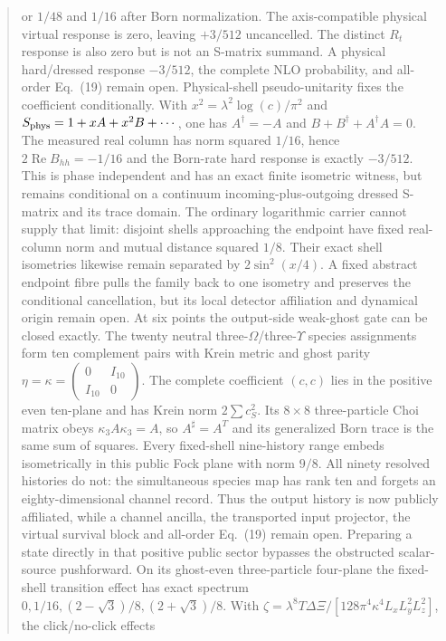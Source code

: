\documentclass[11pt]{article}
\theoremstyle{definition}
\theoremstyle{remark}
\begin{document}
\begin{abstract}
or $1/48$ and $1/16$ after Born normalization.  The axis-compatible physical
virtual response is zero, leaving $+3/512$ uncancelled.  The distinct $R_t$
response is also zero but is not an S-matrix summand.  A physical hard/dressed
response $-3/512$, the complete NLO probability, and all-order Eq.~(19) remain
open.
Physical-shell pseudo-unitarity fixes the coefficient conditionally.  With
$x^2=\lambda^2\log(c)/\pi^2$ and
$S_{\rm phys}=1+xA+x^2B+\cdots$, one has
$A^\dagger=-A$ and $B+B^\dagger+A^\dagger A=0$.  The measured real column has
norm squared $1/16$, hence $2\operatorname{Re}B_{hh}=-1/16$ and the Born-rate
hard response is exactly $-3/512$.  This is phase independent and has an exact
finite isometric witness, but remains conditional on a continuum
incoming-plus-outgoing dressed S-matrix and its trace domain.
The ordinary logarithmic carrier cannot supply that limit: disjoint shells
approaching the endpoint have fixed real-column norm and mutual distance
squared $1/8$.  Their exact shell isometries likewise remain separated by
$2\sin^2(x/4)$.  A fixed abstract endpoint fibre pulls the family back to one
isometry and preserves the conditional cancellation, but its local detector
affiliation and dynamical origin remain open.
At six points the output-side weak-ghost gate can be closed exactly.  The
twenty neutral three-$\Omega$/three-$\Upsilon$ species assignments form ten
complement pairs with Krein metric and ghost parity
$\eta=\kappa=\left(\begin{smallmatrix}0&I_{10}\\I_{10}&0\end{smallmatrix}\right)$.
The complete coefficient $(c,c)$ lies in the positive even ten-plane and has
Krein norm $2\sum c_S^2$.  Its $8\times8$ three-particle Choi matrix obeys
$\kappa_3A\kappa_3=A$, so $A^\sharp=A^T$ and its generalized Born trace is
the same sum of squares.  Every fixed-shell nine-history range embeds
isometrically in this public Fock plane with norm $9/8$.  All ninety resolved
histories do not: the simultaneous species map has rank ten and forgets an
eighty-dimensional channel record.  Thus the output history is now publicly
affiliated, while a channel ancilla, the transported input projector, the
virtual survival block and all-order Eq.~(19) remain open.
Preparing a state directly in that positive public sector bypasses the
obstructed scalar-source pushforward.  On its ghost-even three-particle
four-plane the fixed-shell transition effect has exact spectrum
$0,1/16,(2-\sqrt3)/8,(2+\sqrt3)/8$.  With
$\zeta=\lambda^8T\Delta\Xi/
[128\pi^4\kappa^4L_xL_y^2L_z^2]$, the click/no-click effects

\end{abstract}
\end{document}
